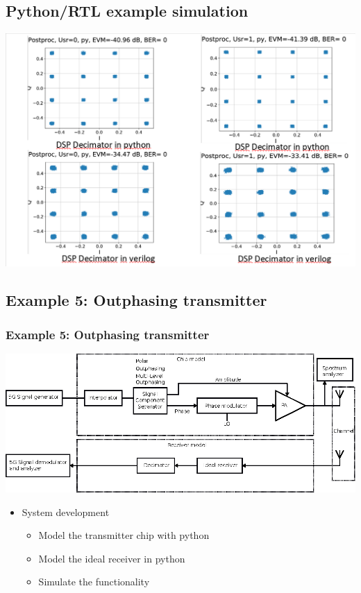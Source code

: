 \documentclass{sdkslides}
\begin{document}
\renewcommand{\sectionname}{Python/RTL example simulation}
\subsection*{\sectionname}
\begin{frame}[c]
    \includegraphics[width=\textwidth]{Pics/DSP-example-fader2-decimator_effect.png}
\end{frame}

\renewcommand{\sectionname}{Example 5: Outphasing transmitter}
\subsection*{\sectionname}
\begin{frame}[c]
    \frametitle{\sectionname}
    \centering\includegraphics[width=\textwidth]{Pics/HT_system.eps}
    \begin{itemize}
        \item System development
            \begin{itemize}
                \item  Model the transmitter chip with python
                \item  Model the ideal receiver in python
                \item  Simulate the functionality
            \end{itemize}
    \end{itemize}
\end{frame}
\end{document}
